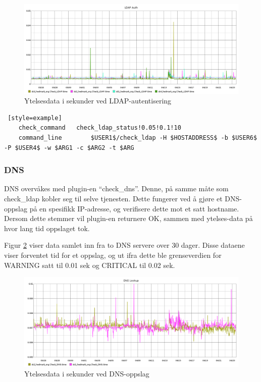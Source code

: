 \begin{figure}[H]
    \centering
    \includegraphics[width=1.0\textwidth]{img/ldap-auth-inv}
    \caption{Ytelsesdata i sekunder ved LDAP-autentisering}
    \label{ldapauth-inv}
\end{figure}
\begin{lstlisting} [style=example]
    check_command 	check_ldap_status!0.05!0.1!10
    command_line    	$USER1$/check_ldap -H $HOSTADDRESS$ -b $USER6$ -P $USER4$ -w $ARG1 -c $ARG2 -t $ARG
\end{lstlisting}

\subsubsection*{DNS}
DNS overvåkes med plugin-en ``check\_dns''. Denne, på samme måte som check\_ldap kobler seg til selve tjenesten. Dette fungerer ved å gjøre et DNS-oppslag på en spesifikk IP-adresse, og verifisere dette mot et satt hostname. Dersom dette stemmer vil plugin-en returnere OK, sammen med ytelses-data på hvor lang tid oppslaget tok.

Figur \ref{dns-inv} viser data samlet inn fra to DNS servere over 30 dager. Disse dataene viser forventet tid for et oppslag, og ut ifra dette ble grenseverdien for WARNING satt til 0.01 sek og CRITICAL til 0.02 sek.

\begin{figure}[H]
    \centering
    \includegraphics[width=1.0\textwidth]{img/dns-inv}
    \caption{Ytelsesdata i sekunder ved DNS-oppslag}
    \label{dns-inv}
\end{figure}

